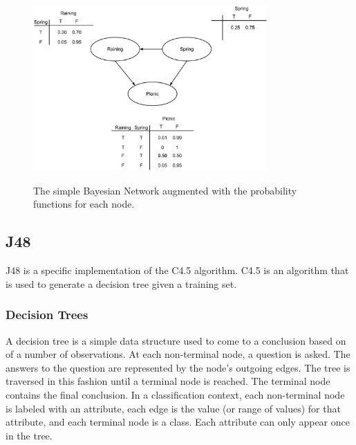 \documentclass[12pt]{ucthesis}
\newcommand{\captionfonts}{\small\bf\ssp}
\begin{document}
\begin{figure}
   \begin{center}
      \includegraphics[width=0.8\textwidth]{images/Bayes_Net_2.eps}
      \captionfonts
      \caption[Bayes Net With Probabilities]{The simple Bayesian Network augmented with the probability functions for each node.}
      \label{fig:bayesNet2}
   \end{center}
\end{figure}

\subsection{J48}
\label{background-classifiers-j48}
J48 is a specific implementation of the C4.5 algorithm.
C4.5 is an algorithm that is used to generate a decision tree given a training set.

\subsubsection{Decision Trees}
\label{background-classifiers-j48-decision-trees}
A decision tree is a simple data structure used to come to a conclusion based on of a number of observations.
At each non-terminal node, a question is asked. The answers to the question are represented by the node's outgoing edges.
The tree is traversed in this fashion until a terminal node is reached. The terminal node contains the final conclusion.
In a classification context, each non-terminal node is labeled with an attribute, each edge is the value (or range of values)
for that attribute, and each terminal node is a class. Each attribute can only appear once in the tree.
\end{document}
